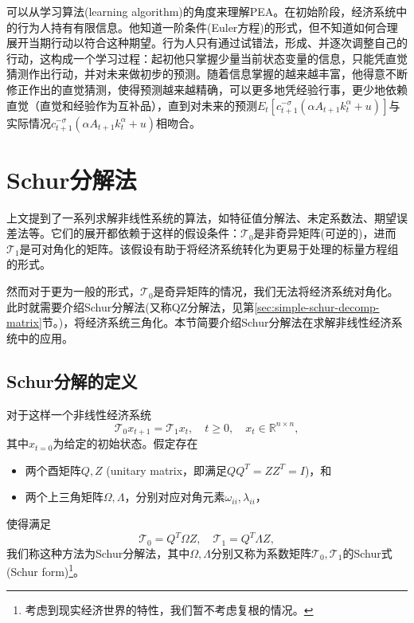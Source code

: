可以从学习算法(learning algorithm)的角度来理解PEA。在初始阶段，经济系统中的行为人持有有限信息。他知道一阶条件(Euler方程)的形式，但不知道如何合理展开当期行动以符合这种期望。行为人只有通过试错法，形成、并逐次调整自己的行动，这构成一个学习过程：起初他只掌握少量当前状态变量的信息，只能凭直觉猜测作出行动，并对未来做初步的预测。随着信息掌握的越来越丰富，他得意不断修正作出的直觉猜测，使得预测越来越精确，可以更多地凭经验行事，更少地依赖直觉（直觉和经验作为互补品），直到对未来的预测$E_t \left[ c _{t+1}^{-\sigma} \left( \alpha A_{t+1} k_{t}^{\alpha} + u \right)\right]$与实际情况$c _{t+1}^{-\sigma} \left( \alpha A_{t+1} k_{t}^{\alpha} + u \right)$相吻合。

\section{Schur分解法}
\label{sec:simple-schur-decomp}
上文提到了一系列求解非线性系统的算法，如特征值分解法、未定系数法、期望误差法等。它们的展开都依赖于这样的假设条件：$\mathcal{T}_0$是非奇异矩阵(可逆的)，进而$\mathcal{T}_1$是可对角化的矩阵。该假设有助于将经济系统转化为更易于处理的标量方程组的形式。



然而对于更为一般的形式，$\mathcal{T}_0$是奇异矩阵的情况，我们无法将经济系统对角化。此时就需要介绍Schur分解法(又称QZ分解法，见第\ref{sec:simple-schur-decomp-matrix}节。)，将经济系统三角化。本节简要介绍Schur分解法在求解非线性经济系统中的应用。

\subsection{Schur分解的定义}

对于这样一个非线性经济系统
\begin{equation}
  \label{eq:simple-schur-econ-system-def}
  \mathcal{T}_0 x_{t+1} = \mathcal{T}_1 x_t, \quad t \ge 0, \quad x_t \in \mathbb{R}^{n \times n},
\end{equation}
其中$x_{t=0}$为给定的初始状态。假定存在
\begin{itemize}
  \item 两个酉矩阵$Q,Z$ (unitary matrix，即满足$Q Q^T = Z Z^T = I$)，和
  \item 两个上三角矩阵$\Omega, \Lambda$，分别对应对角元素$\omega_{ii}, \lambda_{ii}$，
\end{itemize}
使得满足
\begin{equation}
  \label{eq:simple-schur-def-t0-t1}
  \mathcal{T}_0 = Q^T \Omega Z, \quad \mathcal{T}_1 = Q^T \Lambda Z,
\end{equation}
我们称这种方法为Schur分解法，其中$\Omega, \Lambda$分别又称为系数矩阵$\mathcal{T}_0, \mathcal{T}_1$的Schur式(Schur form)\footnote{考虑到现实经济世界的特性，我们暂不考虑复根的情况。}。

